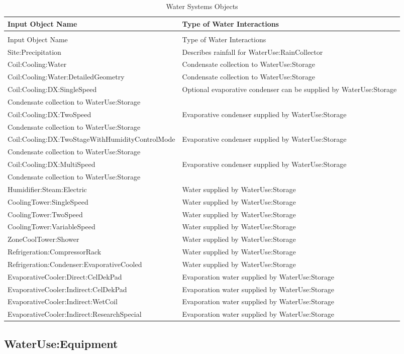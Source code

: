 \begin{longtable}[c]{p{2.49in}p{3.5in}}
\caption{Water Systems Objects \label{table:water-systems-objects}} \tabularnewline
\toprule 
Input Object Name & Type of Water Interactions \tabularnewline
\midrule
\endfirsthead

\caption[]{Water Systems Objects} \tabularnewline
\toprule 
Input Object Name & Type of Water Interactions \tabularnewline
\midrule
\endhead

Site:Precipitation & Describes rainfall for WaterUse:RainCollector \tabularnewline
Coil:Cooling:Water & Condensate collection to WaterUse:Storage \tabularnewline
Coil:Cooling:Water:DetailedGeometry & Condensate collection to WaterUse:Storage \tabularnewline
Coil:Cooling:DX:SingleSpeed & Optional evaporative condenser can be supplied by WaterUse:Storage \tabularnewline
Condensate collection to WaterUse:Storage \tabularnewline
Coil:Cooling:DX:TwoSpeed & Evaporative condenser supplied by WaterUse:Storage \tabularnewline
Condensate collection to WaterUse:Storage \tabularnewline
Coil:Cooling:DX:TwoStageWithHumidityControlMode & Evaporative condenser supplied by WaterUse:Storage \tabularnewline
Condensate collection to WaterUse:Storage \tabularnewline
Coil:Cooling:DX:MultiSpeed & Evaporative condenser supplied by WaterUse:Storage \tabularnewline
Condensate collection to WaterUse:Storage \tabularnewline
Humidifier:Steam:Electric & Water supplied by WaterUse:Storage \tabularnewline
CoolingTower:SingleSpeed & Water supplied by WaterUse:Storage \tabularnewline
CoolingTower:TwoSpeed & Water supplied by WaterUse:Storage \tabularnewline
CoolingTower:VariableSpeed & Water supplied by WaterUse:Storage \tabularnewline
ZoneCoolTower:Shower & Water supplied by WaterUse:Storage \tabularnewline
Refrigeration:CompressorRack & Water supplied by WaterUse:Storage \tabularnewline
Refrigeration:Condenser:EvaporativeCooled & Water supplied by WaterUse:Storage \tabularnewline
EvaporativeCooler:Direct:CelDekPad & Evaporation water supplied by WaterUse:Storage \tabularnewline
EvaporativeCooler:Indirect:CelDekPad & Evaporation water supplied by WaterUse:Storage \tabularnewline
EvaporativeCooler:Indirect:WetCoil & Evaporation water supplied by WaterUse:Storage \tabularnewline
EvaporativeCooler:Indirect:ResearchSpecial & Evaporation water supplied by WaterUse:Storage \tabularnewline
\bottomrule
\end{longtable}

\subsection{WaterUse:Equipment}\label{wateruseequipment}

